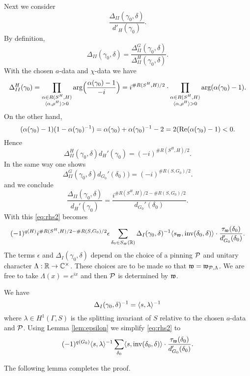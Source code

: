 \documentclass{article}
\theoremstyle{definition}
\numberwithin{equation}{section}
\renewcommand{\-}{\hyp{}}
\begin{document}
Next we consider
\[ \frac{\Delta_{II}(\gamma_0,\delta)}{d'_H(\gamma_0)}.\]
By definition,
\[ \Delta_{II}(\gamma_0,\delta) = \frac{\Delta_{II}^G(\gamma_0,\delta)}{\Delta_{II}^H(\gamma_0,\delta)}.\]
With the chosen $a$-data and $\chi$-data we have
\[ \Delta_{II}^H(\gamma_0)=\prod\limits_{\substack{\alpha \in R(S^H,H)\\ \langle\alpha,\rho^H\rangle>0}}\textrm{arg}\Big(\frac{\alpha(\gamma_0)-1}{-i}\Big) = i^{\#R(S^H,H)/2}\cdot\prod\limits_{\substack{\alpha \in R(S^H,H)\\ \langle\alpha,\rho^H\rangle>0}}\textrm{arg}(\alpha(\gamma_0)-1). \]
On the other hand,
\[ (\alpha(\gamma_0)-1)(1-\alpha(\gamma_0)^{-1})=\alpha(\gamma_0)+\alpha(\gamma_0)^{-1}-2=2(\textrm{Re}(\alpha(\gamma_0)-1) < 0.\]
Hence
\[ \Delta_{II}^H(\gamma_0,\delta)d_H'(\gamma_0) = (-i)^{\#R(S^H,H)/2}. \]
In the same way one shows
\[ \Delta_{II}^G(\gamma_0,\delta)d_{G_0}'(\delta_0)) = (-i)^{\#R(S,G_0)/2}. \]
and we conclude
\[ \frac{\Delta_{II}(\gamma_0,\delta)}{d_H'(\gamma_0)} = \frac{i^{\#R(S^H,H)/2-\#R(S,G_0)/2}}{d_{G_0}'(\delta_0)}.\]
With this \eqref{eq:rhs2} becomes
\[ (-1)^{q(H)}i^{\#R(S^H,H)/2-\#R(S,G_0)/2}\epsilon \sum_{\delta_0 \in S_{\mathfrak{w}}(\mathbb{R})}\Delta_I(\gamma_0,\delta)^{-1} \langle s_{\mathfrak{w}},\textrm{inv}(\delta_0,\delta)\rangle \cdot\frac{\tau_{\mathfrak{w}}(\delta_0)}{d'_{G_0}(\delta_0)}. \]
The terms $\epsilon$ and $\Delta_I(\gamma_0,\delta)$ depend on the choice of a pinning $\mathcal{P}$ and unitary character $\Lambda : \mathbb{R} \to \mathbb{C}^\times$. These choices are to be made so that $\mathfrak{w}=\mathfrak{w}_{\mathcal{P},\Lambda}$. We are free to take $\Lambda(x)=e^{ix}$ and then $\mathcal{P}$ is determined by $\mathfrak{w}$. 

We have
\[ \Delta_{I}(\gamma_0,\delta)^{-1} = \langle s,\lambda\rangle^{-1} \]
where $\lambda \in H^1(\Gamma,S)$ is the splitting invariant of $S$ relative to the chosen $a$-data and $\mathcal{P}$. Using Lemma \ref{lem:epsilon} we simplify \eqref{eq:rhs2} to
\[(-1)^{q(G_0)}\langle s,\lambda\rangle^{-1}\sum_{\delta_0}\langle s,\textrm{inv}(\delta_0,\delta)\rangle\cdot\frac{\tau_{\mathfrak{w}}(\delta_0)}{d_{G_0}'(\delta_0)}. \]

The following lemma completes the proof.
\end{document}
